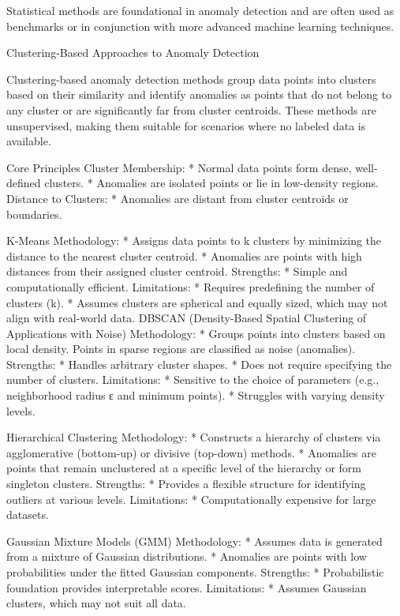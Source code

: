 Statistical methods are foundational in anomaly detection and are often used as benchmarks or in conjunction with more advanced machine learning techniques.



\sec Clustering-Based Approaches to Anomaly Detection

Clustering-based anomaly detection methods group data points into clusters based on their similarity and identify anomalies as points that do not belong to any cluster or are significantly far from cluster centroids. These methods are unsupervised, making them suitable for scenarios where no labeled data is available.

\secc Core Principles
Cluster Membership:
\begitems
* Normal data points form dense, well-defined clusters.
* Anomalies are isolated points or lie in low-density regions.
\enditems
Distance to Clusters:
\begitems
* Anomalies are distant from cluster centroids or boundaries.
\enditems


\secc K-Means
Methodology:
\begitems
* Assigns data points to k clusters by minimizing the distance to the nearest cluster centroid.
* Anomalies are points with high distances from their assigned cluster centroid.
\enditems
\nl
Strengths:
\begitems
* Simple and computationally efficient.
\enditems
\nl
Limitations:
\begitems
* Requires predefining the number of clusters (k).
* Assumes clusters are spherical and equally sized, which may not align with real-world data.
\enditems
\secc DBSCAN (Density-Based Spatial Clustering of Applications with Noise)
Methodology:
\begitems
* Groups points into clusters based on local density. Points in sparse regions are classified as noise (anomalies).
\enditems
\nl
Strengths:
\begitems
* Handles arbitrary cluster shapes.
* Does not require specifying the number of clusters.
\enditems
\nl
Limitations:
\begitems
* Sensitive to the choice of parameters (e.g., neighborhood radius ε and minimum points).
* Struggles with varying density levels.
\enditems

\secc Hierarchical Clustering
Methodology:
\begitems
* Constructs a hierarchy of clusters via agglomerative (bottom-up) or divisive (top-down) methods.
* Anomalies are points that remain unclustered at a specific level of the hierarchy or form singleton clusters.
\enditems
\nl
Strengths:
\begitems
* Provides a flexible structure for identifying outliers at various levels.
\enditems
\nl
Limitations:
\begitems
* Computationally expensive for large datasets.
\enditems

\secc Gaussian Mixture Models (GMM)
Methodology:
\begitems
 * Assumes data is generated from a mixture of Gaussian distributions.
* Anomalies are points with low probabilities under the fitted Gaussian components.
\enditems
\nl
Strengths:
\begitems
* Probabilistic foundation provides interpretable scores.
\enditems
\nl
Limitations:
\begitems
* Assumes Gaussian clusters, which may not suit all data.
\enditems

